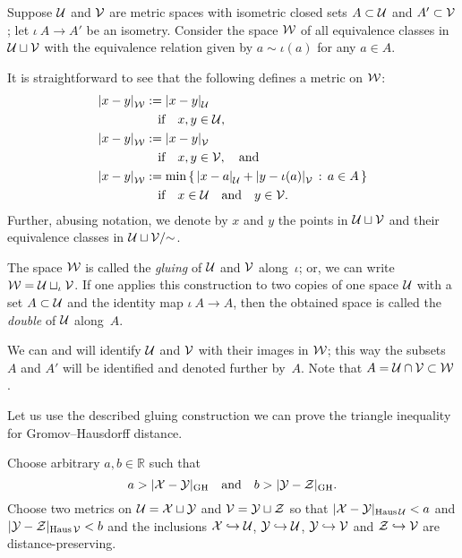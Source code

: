 Suppose 
$\mathcal{U}$ and $\mathcal{V}$ are metric spaces 
with isometric closed sets $A\subset\mathcal{U}$ and $A'\subset\mathcal{V}$;
let $\iota\:A\to A'$ be an isometry.
Consider the space $\mathcal{W}$ of all equivalence classes in $\mathcal{U}\sqcup\mathcal{V}$ with the equivalence relation given by $a\sim\iota(a)$ for any $a\in A$.

It is straightforward to see that the following defines a metric on $\mathcal{W}$:
\begin{align*}
\dist{x}{y}{\spc{W}}&\df\dist{x}{y}{\spc{U}}
\\
&\quad\text{if}\quad x,y\in \spc{U},
\\
\dist{x}{y}{\spc{W}}&\df\dist{x}{y}{\spc{V}}
\\
&\quad\text{if}\quad x,y\in \spc{V},\quad\text{and}
\\
\dist{x}{y}{\spc{W}}&\df\min\set{\dist{x}{a}{\spc{U}}+\dist{y}{\iota(a)}{\spc{V}}}{a\in A}
\\
&\quad\text{if}\quad x\in \spc{U}\quad\text{and}\quad y\in \spc{V}.
\end{align*}
Further, abusing notation, we denote by $x$ and $y$ the points in $\mathcal{U}\sqcup\mathcal{V}$ and their equivalence classes in $\mathcal{U}\sqcup\mathcal{V}/{{\sim}}$.

The  space $\mathcal{W}$ is called the \emph{gluing} of $\mathcal{U}$ and  $\mathcal{V}$ along~$\iota$; or, we can write
$\mathcal{W}=\mathcal{U}\sqcup_\iota\mathcal{V}$.
If one applies this construction to two copies of one space $\mathcal{U}$ with a set $A\subset \mathcal{U}$ and the identity map $\iota\:A\to A$, then the obtained space is called the \emph{double} of $\mathcal{U}$ along~$A$.

We can and will identify $\mathcal{U}$ and $\mathcal{V}$ with their images in $\mathcal{W}$;
this way the subsets $A$ and $A'$ will be identified and denoted further by~$A$.
Note that $A=\mathcal{U}\cap \mathcal{V}\subset \mathcal{W}$.

Let us use the described gluing construction we can prove the triangle inequality for Gromov--Hausdorff distance.

Choose arbitrary $a,b \in \mathbb{R}$ such that
$$a>|\mathcal{X}-\mathcal{Y}|_{\operatorname{\rm GH}\nolimits}
\quad\text{and}\quad
b>|\mathcal{Y}-\mathcal{Z}|_{\operatorname{\rm GH}\nolimits}.$$
Choose two metrics on $\mathcal{U}=\mathcal{X}\sqcup \mathcal{Y}$ and $\mathcal{V}=\mathcal{Y}\sqcup \mathcal{Z}$ so that
$|\spc{X}\z-\spc{Y}|_{\Haus\spc{U}}<a$ and $|\mathcal{Y}-\mathcal{Z}|_{\operatorname{\rm Haus}\nolimits\mathcal{V}}<b$ 
and the inclusions $\mathcal{X}\hookrightarrow \mathcal{U}$, $\mathcal{Y}\hookrightarrow \mathcal{U}$, $\mathcal{Y}\hookrightarrow \mathcal{V}$ and $\mathcal{Z}\hookrightarrow \mathcal{V}$ are distance-preserving.

